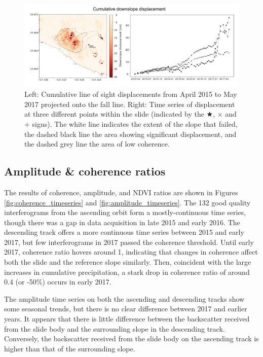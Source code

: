 \documentclass[journal abbreviation, manuscript]{copernicus}
\begin{document}
\begin{figure}[hbt!]
    \centering
    \includegraphics[width=\textwidth]{displacement_all_outlines.pdf}
    \caption{Left: Cumulative line of sight displacements from April 2015 to May 2017 projected onto the fall line. Right: Time series of displacement at three different points within the slide (indicated by the $\bigstar$, $\times$ and + signs). The white line indicates the extent of the slope that failed, the dashed black line the area showing significant displacement, and the dashed grey line the area of low coherence.}
    \label{fig:displacement}
\end{figure}

\subsection{Amplitude \& coherence ratios}
The results of coherence, amplitude, and NDVI ratios are shown in Figures \ref{fig:coherence_timeseries} and \ref{fig:amplitude_timeseries}. The 132 good quality interferograms from the ascending orbit form a mostly-continuous time series, though there was a gap in data acquisition in late 2015 and early 2016. The descending track offers a more continuous time series between 2015 and early 2017, but few interferograms in 2017 passed the coherence threshold. Until early 2017, coherence ratio hovers around 1, indicating that changes in coherence affect both the slide and the reference slope similarly. Then, coincident with the large increases in cumulative precipitation, a stark drop in coherence ratio of around 0.4 (or -50\%) occurs in early 2017.  \par
The amplitude time series on both the ascending and descending tracks show some seasonal trends, but there is no clear difference between 2017 and earlier years. It appears that there is little difference between the backscatter received from the slide body and the surrounding slope in the descending track. Conversely, the backscatter received from the slide body on the ascending track is higher than that of the surrounding slope.  
\end{document}
